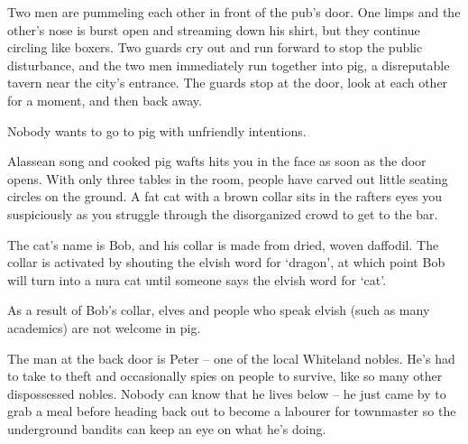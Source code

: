 \begin{multicols}{2}
\begin{boxtext}

	Two men are pummeling each other in front of the pub's door.
	 One limps and the other's nose is burst open and streaming down his shirt, but they continue circling like boxers.
	 Two guards cry out and run forward to stop the public disturbance, and the two men immediately run together into \gls{pig}, a disreputable tavern near the city's entrance.
	 The guards stop at the door, look at each other for a moment, and then back away.

Nobody wants to go to \gls{pig} with unfriendly intentions.

\end{boxtext}
 
\begin{table*}[t]

\label{mincing_pig_map}

\end{table*}


\begin{boxtext}

	Alassean song and cooked pig wafts hits you in the face as soon as the door opens.  With only three tables in the room, people have carved out little seating circles on the ground.  A fat cat with a brown collar sits in the rafters eyes you suspiciously as you struggle through the disorganized crowd to get to the bar.

\end{boxtext}

The cat's name is Bob, and his collar is made from dried, woven daffodil.  The collar is activated by shouting the elvish word for `dragon', at which point Bob will turn into a nura cat until someone says the elvish word for `cat'.

As a result of Bob's collar, elves and people who speak elvish (such as many academics) are not welcome in \gls{pig}.


\nuracat


The man at the back door is Peter -- one of the local Whiteland nobles. He's had to take to theft and occasionally spies on people to survive, like so many other dispossessed nobles.  Nobody can know that he lives below -- he just came by to grab a meal before heading back out to become a labourer for \gls{townmaster} so the underground bandits can keep an eye on what he's doing.


\end{multicols}
